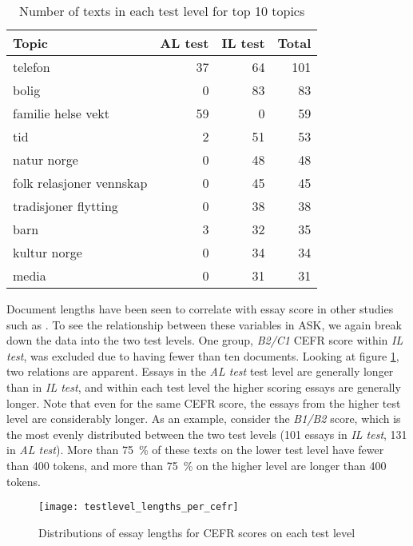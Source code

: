 \begin{table}
  \centering
  \begin{tabular}{lrrr}
    \toprule
    Topic                    & AL test & IL test & Total \\
    \midrule
    telefon                  &      37 &      64 &   101 \\
    bolig                    &       0 &      83 &    83 \\
    familie helse vekt       &      59 &       0 &    59 \\
    tid                      &       2 &      51 &    53 \\
    natur norge              &       0 &      48 &    48 \\
    folk relasjoner vennskap &       0 &      45 &    45 \\
    tradisjoner flytting     &       0 &      38 &    38 \\
    barn                     &       3 &      32 &    35 \\
    kultur norge             &       0 &      34 &    34 \\
    media                    &       0 &      31 &    31 \\
    \bottomrule
  \end{tabular}
  \caption{Number of texts in each test level for top 10 topics}
  \label{texts-per-topic}
\end{table}

Document lengths have been seen to correlate with essay score in other
studies such as \textcite{vajjala17}. To see the relationship between these
variables in ASK, we again break down the data into the two test levels. One
group, \emph{B2/C1} CEFR score within \emph{IL test}, was excluded due to
having fewer than ten documents. Looking at figure
\ref{testlevel-lengths-per-cefr}, two relations are apparent. Essays in the
\emph{AL test} test level are generally longer than in \emph{IL test}, and
within each test level the higher scoring essays are generally longer. Note
that even for the same CEFR score, the essays from the higher test level are
considerably longer. As an example, consider the \emph{B1/B2} score, which is
the most evenly distributed between the two test levels (101 essays in
\emph{IL test}, 131 in \emph{AL test}). More than 75~\% of these texts on
the lower test level have fewer than 400 tokens, and more than 75~\% on the
higher level are longer than 400 tokens.


\begin{figure}
  \centering
  \texttt{[image: testlevel\_lengths\_per\_cefr]}
  \caption{Distributions of essay lengths for CEFR scores on each test level}
  \label{testlevel-lengths-per-cefr}
\end{figure}
 